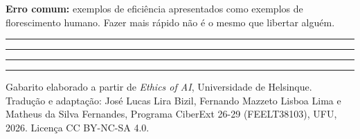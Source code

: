 \documentclass[
  11pt,
]{article}
\newcommand{\faixaEixos}[1][\linewidth]{%
  \noindent
  \textcolor{iaConceitos}{\rule{0.3333#1}{4pt}}%
  \textcolor{iaAplic}{\rule{0.3333#1}{4pt}}%
  \textcolor{iaRiscos}{\rule{0.3333#1}{4pt}}%
  \par}
\newenvironment{licenca}
  {\par\vspace{2em}\faixaEixos\par\vspace{0.8em}
   \begingroup\sffamily\scriptsize\color{iaTintaFraca}}
  {\endgroup\par}
\begin{document}
\textbf{Erro comum:} exemplos de eficiência apresentados como exemplos
de florescimento humano. Fazer mais rápido não é o mesmo que libertar
alguém.

\begin{center}\rule{0.5\linewidth}{0.5pt}\end{center}

\begin{licenca}

Gabarito elaborado a partir de \emph{Ethics of AI}, Universidade de
Helsinque. Tradução e adaptação: José Lucas Lira Bizil, Fernando Mazzeto
Lisboa Lima e Matheus da Silva Fernandes, Programa CiberExt 26-29
(FEELT38103), UFU, 2026. Licença CC BY-NC-SA 4.0.

\end{licenca}
\end{document}
